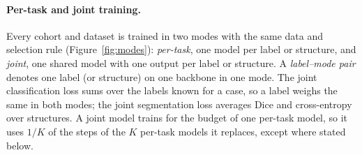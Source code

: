 \paragraph{Per-task and joint training.} Every cohort and dataset is trained in two modes with the same data and selection rule (Figure~\ref{fig:modes}): \emph{per-task}, one model per label or structure, and \emph{joint}, one shared model with one output per label or structure. A \emph{label--mode pair} denotes one label (or structure) on one backbone in one mode. The joint classification loss sums over the labels known for a case, so a label weighs the same in both modes; the joint segmentation loss averages Dice and cross-entropy over structures. A joint model trains for the budget of one per-task model, so it uses $1/K$ of the steps of the $K$ per-task models it replaces, except where stated below.
